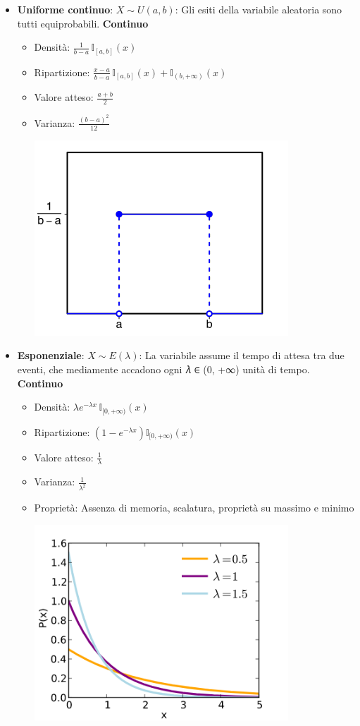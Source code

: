 \documentclass{article}
\begin{document}
\begin{itemize}
    \item \textbf{Uniforme continuo}: $X \sim U(a,b)$: Gli esiti della variabile aleatoria sono tutti equiprobabili. \textbf{Continuo}
    \begin{itemize}
        \item Densità: $\frac{1}{b-a} \, \mathbb{I}_{[a,b]}(x)$
        \item Ripartizione: $\frac{x-a}{b-a} \, \mathbb{I}_{[a,b]}(x) + \mathbb{I}_{(b, +\infty)}(x)$
        \item Valore atteso: $\frac{a + b}{2}$
        \item Varianza: $\frac{(b-a)^2}{12}$
        \begin{center}
            \includegraphics[width=0.4\linewidth]{./immagini/uniformeContinuo.png}
        \end{center}
    \end{itemize}

    \item \textbf{Esponenziale}: $X \sim E(\lambda)$: La variabile assume il tempo di attesa tra due eventi, che mediamente accadono ogni 𝜆 ∈ (0, +∞) unità di tempo. \textbf{Continuo}
    \begin{itemize}
        \item Densità: $\lambda e^{-\lambda x} \, \mathbb{I}_{[0, +\infty)}(x)$
        \item Ripartizione: $\left(1 - e^{-\lambda x} \right) \mathbb{I}_{[0, +\infty)}(x)$
        \item Valore atteso: $\frac{1}{\lambda}$
        \item Varianza: $\frac{1}{\lambda^2}$
        \item Proprietà: Assenza di memoria, scalatura, proprietà su massimo e minimo
        \begin{center}
            \includegraphics[width=0.4\linewidth]{./immagini/esponenziale.png}
        \end{center}
    \end{itemize}


\end{itemize}
\end{document}
